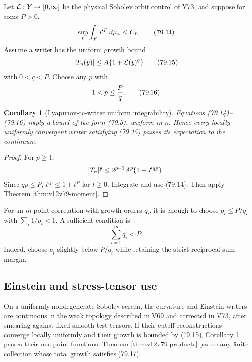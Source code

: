 \documentclass[11pt]{article}
\newtheorem{corollary}[theorem]{Corollary}
\theoremstyle{remark}
\begin{document}
Let \({\cal L}:Y\to[0,\infty]\) be the physical Sobolev orbit control
of V73, and suppose for some \(P>0\),
\begin{equation}
                         \sup_n\int_Y{\cal L}^P\,d\mu_n
                         \leq C_L.                           \tag{79.14}
\end{equation}
Assume a writer has the uniform growth bound
\begin{equation}
                         |T_n(y)|
                         \leq A\{1+{\cal L}(y)^q\}            \tag{79.15}
\end{equation}
with \(0<q<P\).  Choose any \(p\) with
\[
                              1<p\leq {P\over q}.             \tag{79.16}
\]

\begin{corollary}[Lyapunov-to-writer uniform integrability]
\label{cor:v12v79-growth}
Equations (79.14)--(79.16) imply a bound of the form (79.5), uniform
in \(n\).  Hence every locally uniformly convergent writer satisfying
(79.15) passes its expectation to the continuum.
\end{corollary}

\begin{proof}
For \(p\geq1\),
\[
 |T_n|^p
 \leq 2^{p-1}A^p\{1+{\cal L}^{qp}\}.
\]
Since \(qp\leq P\),
\(t^{qp}\leq1+t^P\) for \(t\geq0\).  Integrate and use (79.14).
Then apply Theorem \ref{thm:v12v79-moment}.
\end{proof}

For an \(m\)-point correlation with growth orders \(q_i\), it is
enough to choose \(p_i\leq P/q_i\) with
\(\sum_i1/p_i<1\).  A sufficient condition is
\begin{equation}
                              \sum_{i=1}^m q_i<P.             \tag{79.17}
\end{equation}
Indeed, choose \(p_i\) slightly below \(P/q_i\) while retaining the
strict reciprocal-sum margin.

\subsection{Einstein and stress-tensor use}

On a uniformly nondegenerate Sobolev screen, the curvature and
Einstein writers are continuous in the weak topology described in
V69 and corrected in V73, after smearing against fixed smooth test
tensors.  If their cutoff reconstructions converge locally uniformly
and their growth is bounded by (79.15), Corollary
\ref{cor:v12v79-growth} passes their one-point functions.
Theorem \ref{thm:v12v79-products} passes any finite collection whose
total growth satisfies (79.17).
\end{document}
